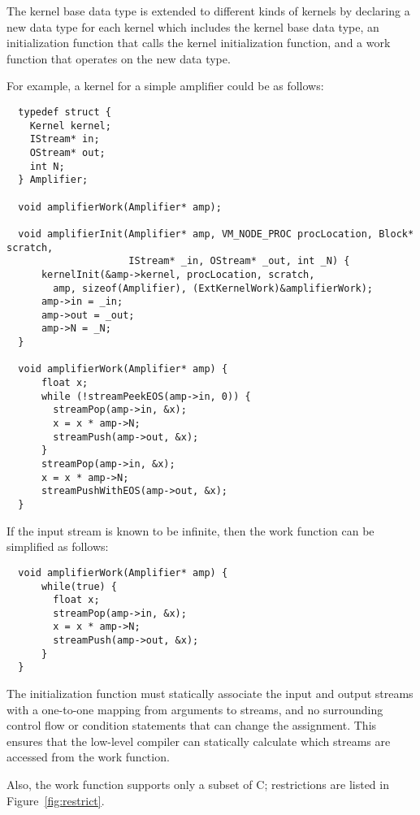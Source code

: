 The kernel base data type is extended to different kinds of kernels by
declaring a new data type for each kernel which includes the kernel
base data type, an initialization function that calls the kernel
initialization function, and a work function that operates on the new
data type.

For example, a kernel for a simple amplifier could be as follows:
 
{\small
\begin{verbatim}
  typedef struct {
    Kernel kernel;
    IStream* in;
    OStream* out;
    int N;
  } Amplifier;

  void amplifierWork(Amplifier* amp);

  void amplifierInit(Amplifier* amp, VM_NODE_PROC procLocation, Block* scratch, 
                     IStream* _in, OStream* _out, int _N) {
      kernelInit(&amp->kernel, procLocation, scratch, 
        amp, sizeof(Amplifier), (ExtKernelWork)&amplifierWork);
      amp->in = _in;
      amp->out = _out;
      amp->N = _N;
  }
 
  void amplifierWork(Amplifier* amp) {
      float x;
      while (!streamPeekEOS(amp->in, 0)) {
        streamPop(amp->in, &x);
        x = x * amp->N;
        streamPush(amp->out, &x);
      }
      streamPop(amp->in, &x);
      x = x * amp->N;
      streamPushWithEOS(amp->out, &x);
  }
\end{verbatim}}

\noindent If the input stream is known to be infinite, then the work
function can be simplified as follows:

{\small
\begin{verbatim}
  void amplifierWork(Amplifier* amp) {
      while(true) {
        float x;
        streamPop(amp->in, &x);
        x = x * amp->N;
        streamPush(amp->out, &x);
      }
  }
\end{verbatim}}


The initialization function must statically associate the input and
output streams with a one-to-one mapping from arguments to streams,
and no surrounding control flow or condition statements that can
change the assignment.  This ensures that the low-level compiler can
statically calculate which streams are accessed from the work
function.

Also, the work function supports only a subset of C; restrictions are
listed in Figure~\ref{fig:restrict}.

